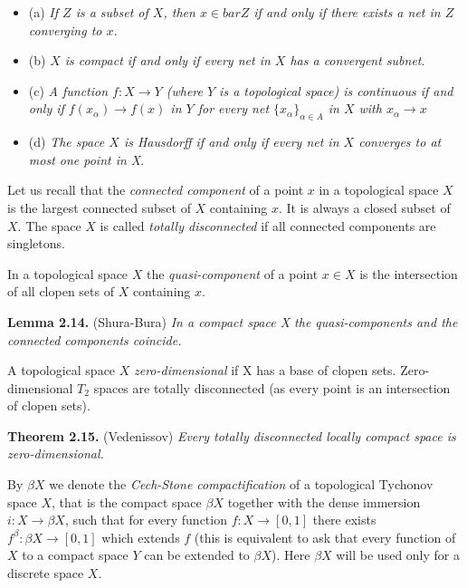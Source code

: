 \documentclass[12pt]{article}
\begin{document}
    
        \begin{itemize}

            \item (a) \emph{If $ Z $ is a subset of $ X $, then $ x \in bar{Z} $ if and only if there exists a net in $ Z $ converging to $ x $.}
                
            \item (b) \emph{$ X $ is compact if and only if every net in $ X $ has a convergent subnet}.

            \item (c) \emph{A function $ f : X \to Y $ (where $ Y $ is a topological space) is continuous if and only if $ f(x_{\alpha}) \to f(x) $ in $ Y $ for 
            every net $ \{ x_{\alpha} \}_{\alpha \in A} $ in $ X $ with $ x_{\alpha} \to x $}

            \item (d) \emph{The space $ X $ is Hausdorff if and only if every net in $ X $ converges to at most one point in X}.
                
        \end{itemize}


        Let us recall that the \emph{connected component} of a point $ x $ in a topological space $ X $ is the largest connected
    subset of $ X $ containing $ x $. It is always a closed subset of $ X $. The space $ X $ is called \emph{totally disconnected} if all
    connected components are singletons.
        
        
        In a topological space $ X $ the \emph{quasi-component} of a point $ x \in X $ is the intersection of all clopen sets of $ X $
    containing $ x $. 


    \textbf{Lemma 2.14.} (Shura-Bura) \emph{In a compact space X the quasi-components and the connected components coincide.}
    
    
        A topological space $ X $ \emph{zero-dimensional} if X has a base of clopen sets. Zero-dimensional $ T_2 $ spaces are totally
    disconnected (as every point is an intersection of clopen sets).


    \textbf{Theorem 2.15.} (Vedenissov) \emph{Every totally disconnected locally compact space is zero-dimensional.}
    
    
        By $\beta X$ we denote the \emph{Cech-Stone compactification} of a topological Tychonov space $ X $, that is the compact
    space $\beta X$ together with the dense immersion $i : X \to \beta X$, such that for every function $f : X \to [0, 1]$ there
    exists $f^{\beta} : \beta X → [0, 1]$ which extends $ f $ (this is equivalent to ask that every function of $ X $ to a compact space
    $ Y $ can be extended to $\beta X$). Here $\beta X$ will be used only for a discrete space $ X $.
\end{document}

